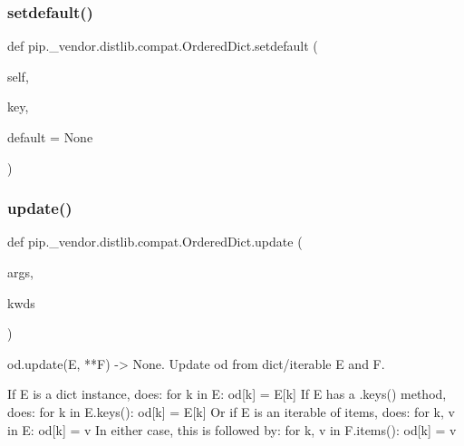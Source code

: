 \subsubsection{\texorpdfstring{setdefault()}{setdefault()}}
{\footnotesize\ttfamily def pip.\+\_\+vendor.\+distlib.\+compat.\+Ordered\+Dict.\+setdefault (\begin{DoxyParamCaption}\item[{}]{self,  }\item[{}]{key,  }\item[{}]{default = {\ttfamily None} }\end{DoxyParamCaption})}

\mbox{\label{classpip_1_1__vendor_1_1distlib_1_1compat_1_1OrderedDict_abb2b763f31fcd25dd752273b1ec0eb1c}} 
\subsubsection{\texorpdfstring{update()}{update()}}
{\footnotesize\ttfamily def pip.\+\_\+vendor.\+distlib.\+compat.\+Ordered\+Dict.\+update (\begin{DoxyParamCaption}\item[{}]{args,  }\item[{}]{kwds }\end{DoxyParamCaption})}

\begin{DoxyVerb}od.update(E, **F) -> None.  Update od from dict/iterable E and F.

If E is a dict instance, does:           for k in E: od[k] = E[k]
If E has a .keys() method, does:         for k in E.keys(): od[k] = E[k]
Or if E is an iterable of items, does:   for k, v in E: od[k] = v
In either case, this is followed by:     for k, v in F.items(): od[k] = v\end{DoxyVerb}
 \mbox{\label{classpip_1_1__vendor_1_1distlib_1_1compat_1_1OrderedDict_ae885e700527a49116c9ba513931ee1e5}} 
